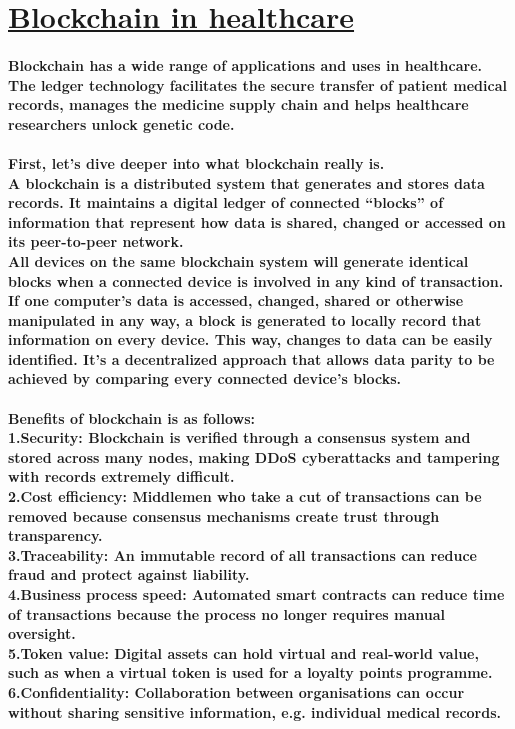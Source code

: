 \documentclass[12pt]{article}
\begin{document}
	\section{\underline{Blockchain in healthcare}}
	\paragraph{Blockchain has a wide range of applications and uses in healthcare. The ledger technology facilitates the secure transfer of patient medical records, manages the medicine supply chain and helps healthcare researchers unlock genetic code.
	\\\\First, let’s dive deeper into what blockchain really is.
    \\A blockchain is a distributed system that generates and stores data records. It maintains a digital ledger of connected “blocks” of information that represent how data is shared, changed or accessed on its peer-to-peer network.
    \\All devices on the same blockchain system will generate identical blocks when a connected device is involved in any kind of transaction. If one computer’s data is accessed, changed, shared or otherwise manipulated in any way, a block is generated to locally record that information on every device. This way, changes to data can be easily identified. It’s a decentralized approach that allows data parity to be achieved by comparing every connected device’s blocks.
    \\\\Benefits of blockchain is as follows:
    \\ 1.Security: Blockchain is verified through a consensus system and stored across many nodes, making DDoS cyberattacks and tampering with records extremely difficult.
    \\ 2.Cost efficiency: Middlemen who take a cut of transactions can be removed because consensus mechanisms create trust through transparency.
    \\ 3.Traceability: An immutable record of all transactions can reduce fraud and protect against liability.
    \\ 4.Business process speed: Automated smart contracts can reduce time of transactions because the process no longer requires manual oversight.
    \\ 5.Token value: Digital assets can hold virtual and real-world value, such as when a virtual token is used for a loyalty points programme.
    \\ 6.Confidentiality: Collaboration between organisations can occur without sharing sensitive information, e.g. individual medical records.
}
\end{document}
